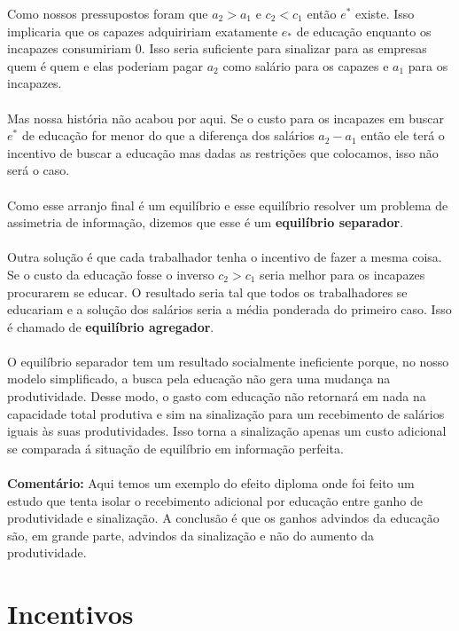 \documentclass[a4paper,11pt,oneside]{book}
\theoremstyle{definition}
\theoremstyle{break}
\begin{document}
Como nossos pressupostos foram que $a_2 > a_1$ e $c_2 < c_1$ então $e^*$ existe. Isso implicaria que os capazes adquiririam exatamente $e_*$ de educação enquanto os incapazes consumiriam 0. Isso seria suficiente para sinalizar para as empresas quem é quem e elas poderiam pagar $a_2$ como salário para os capazes e $a_1$ para os incapazes.
\\~\\
Mas nossa história não acabou por aqui. Se o custo para os incapazes em buscar $e^*$ de educação for menor do que a diferença dos salários $a_2 - a_1$ então ele terá o incentivo de buscar a educação mas dadas as restrições que colocamos, isso não será o caso.
\\~\\
Como esse arranjo final é um equilíbrio e esse equilíbrio resolver um problema de assimetria de informação, dizemos que esse é um \textbf{equilíbrio separador}.
\\~\\
Outra solução é que cada trabalhador tenha o incentivo de fazer a mesma coisa. Se o custo da educação fosse o inverso $c_2 > c_1$ seria melhor para os incapazes procurarem se educar. O resultado seria tal que todos os trabalhadores se educariam e a solução dos salários seria a média ponderada do primeiro caso. Isso é chamado de \textbf{equilíbrio agregador}.
\\~\\
O equilíbrio separador tem um resultado socialmente ineficiente porque, no nosso modelo simplificado, a busca pela educação não gera uma mudança na produtividade. Desse modo, o gasto com educação não retornará em nada na capacidade total produtiva e sim na sinalização para um recebimento de salários iguais às suas produtividades. Isso torna a sinalização apenas um custo adicional se comparada á situação de equilíbrio em informação perfeita.
\\~\\
\textbf{Comentário:} Aqui temos um exemplo do efeito diploma onde foi feito um estudo que tenta isolar o recebimento adicional por educação entre ganho de produtividade e sinalização. A conclusão é que os ganhos advindos da educação são, em grande parte, advindos da sinalização e não do aumento da produtividade.

\section{Incentivos}
\end{document}
